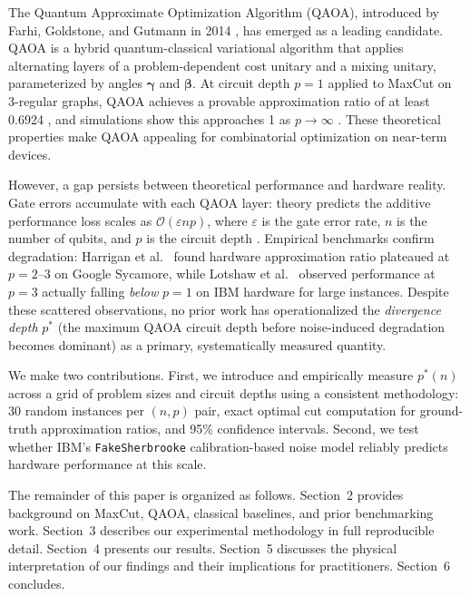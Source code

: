 \documentclass[12pt]{article}
\begin{document}
The Quantum Approximate Optimization Algorithm (QAOA), introduced by Farhi, Goldstone, and Gutmann in 2014 \cite{farhi2014qaoa}, has emerged as a leading candidate. QAOA is a hybrid quantum-classical variational algorithm that applies alternating layers of a problem-dependent cost unitary and a mixing unitary, parameterized by angles $\boldsymbol{\gamma}$ and $\boldsymbol{\beta}$. At circuit depth $p = 1$ applied to MaxCut on 3-regular graphs, QAOA achieves a provable approximation ratio of at least 0.6924 \cite{farhi2014qaoa}, and simulations show this approaches 1 as $p \to \infty$ \cite{zhou2020qaoa}. These theoretical properties make QAOA appealing for combinatorial optimization on near-term devices.

However, a gap persists between theoretical performance and hardware reality. Gate errors accumulate with each QAOA layer: theory predicts the additive performance loss scales as $\mathcal{O}(\varepsilon n p)$, where $\varepsilon$ is the gate error rate, $n$ is the number of qubits, and $p$ is the circuit depth \cite{stilckfranca2021limitations}. Empirical benchmarks confirm degradation: Harrigan et al.\ \cite{harrigan2021quantum} found hardware approximation ratio plateaued at $p = 2$--$3$ on Google Sycamore, while Lotshaw et al.\ \cite{lotshaw2021empirical} observed performance at $p = 3$ actually falling \emph{below} $p = 1$ on IBM hardware for large instances. Despite these scattered observations, no prior work has operationalized the \emph{divergence depth} $p^*$ (the maximum QAOA circuit depth before noise-induced degradation becomes dominant) as a primary, systematically measured quantity.

We make two contributions. First, we introduce and empirically measure $p^*(n)$ across a grid of problem sizes and circuit depths using a consistent methodology: 30 random instances per $(n, p)$ pair, exact optimal cut computation for ground-truth approximation ratios, and 95\% confidence intervals. Second, we test whether IBM's \texttt{FakeSherbrooke} calibration-based noise model reliably predicts hardware performance at this scale.

The remainder of this paper is organized as follows. Section~2 provides background on MaxCut, QAOA, classical baselines, and prior benchmarking work. Section~3 describes our experimental methodology in full reproducible detail. Section~4 presents our results. Section~5 discusses the physical interpretation of our findings and their implications for practitioners. Section~6 concludes.
\end{document}

